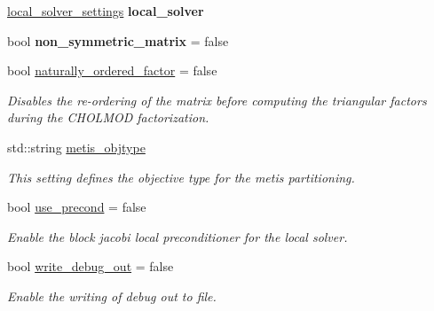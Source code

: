 \begin{DoxyCompactItemize}
\hyperlink{structschwz_1_1Settings_a31e82310ef6aed08168baef78f0db69e}{local\+\_\+solver\+\_\+settings} {\bfseries local\+\_\+solver}
\item 
\mbox{\label{structschwz_1_1Settings_a5f110676f929eebeb357cb07398e2048}} 
bool {\bfseries non\+\_\+symmetric\+\_\+matrix} = false
\item 
bool \hyperlink{structschwz_1_1Settings_a75a2ff3778c7334382a6c74553dbd5b4}{naturally\+\_\+ordered\+\_\+factor} = false
\begin{DoxyCompactList}\small\item\em Disables the re-\/ordering of the matrix before computing the triangular factors during the C\+H\+O\+L\+M\+OD factorization. \end{DoxyCompactList}\item 
\mbox{\label{structschwz_1_1Settings_a8a057e4ac5331c9222ad539ffd1f5c3d}} 
std\+::string \hyperlink{structschwz_1_1Settings_a8a057e4ac5331c9222ad539ffd1f5c3d}{metis\+\_\+objtype}
\begin{DoxyCompactList}\small\item\em This setting defines the objective type for the metis partitioning. \end{DoxyCompactList}\item 
\mbox{\label{structschwz_1_1Settings_ab51cf8eda75e05280084e89895121ca7}} 
bool \hyperlink{structschwz_1_1Settings_ab51cf8eda75e05280084e89895121ca7}{use\+\_\+precond} = false
\begin{DoxyCompactList}\small\item\em Enable the block jacobi local preconditioner for the local solver. \end{DoxyCompactList}\item 
\mbox{\label{structschwz_1_1Settings_af81ff061a4d7220d380fb7f579d7a6e1}} 
bool \hyperlink{structschwz_1_1Settings_af81ff061a4d7220d380fb7f579d7a6e1}{write\+\_\+debug\+\_\+out} = false
\begin{DoxyCompactList}\small\item\em Enable the writing of debug out to file. \end{DoxyCompactList}\item 
\mbox{\label{structschwz_1_1Settings_a5555cf4340e7918ce22d00b26ccca6a7}} 

\end{DoxyCompactItemize}
